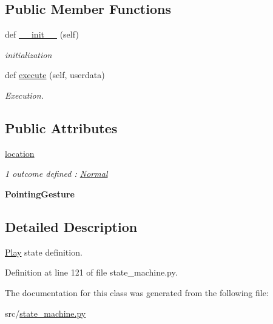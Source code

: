 \subsection*{Public Member Functions}
\begin{DoxyCompactItemize}
\item 
\mbox{\label{classstate__machine_1_1Play_a5993a23d8be7f7b2647f71ede0334957}} 
def \hyperlink{classstate__machine_1_1Play_a5993a23d8be7f7b2647f71ede0334957}{\+\_\+\+\_\+init\+\_\+\+\_\+} (self)
\begin{DoxyCompactList}\small\item\em initialization \end{DoxyCompactList}\item 
\mbox{\label{classstate__machine_1_1Play_a04168d6842960585b4bbcf58f950547b}} 
def \hyperlink{classstate__machine_1_1Play_a04168d6842960585b4bbcf58f950547b}{execute} (self, userdata)
\begin{DoxyCompactList}\small\item\em Execution. \end{DoxyCompactList}\end{DoxyCompactItemize}
\subsection*{Public Attributes}
\begin{DoxyCompactItemize}
\item 
\mbox{\label{classstate__machine_1_1Play_a5817d2ff53ebb02ecf5ceea52ef97a94}} 
\hyperlink{classstate__machine_1_1Play_a5817d2ff53ebb02ecf5ceea52ef97a94}{location}
\begin{DoxyCompactList}\small\item\em 1 outcome defined \+: \hyperlink{classstate__machine_1_1Normal}{Normal} \end{DoxyCompactList}\item 
\mbox{\label{classstate__machine_1_1Play_ad666be4461758154b1f51ddc979bca9b}} 
{\bfseries Pointing\+Gesture}
\end{DoxyCompactItemize}


\subsection{Detailed Description}
\hyperlink{classstate__machine_1_1Play}{Play} state definition. 

Definition at line 121 of file state\+\_\+machine.\+py.



The documentation for this class was generated from the following file\+:\begin{DoxyCompactItemize}
\item 
src/\hyperlink{state__machine_8py}{state\+\_\+machine.\+py}\end{DoxyCompactItemize}
